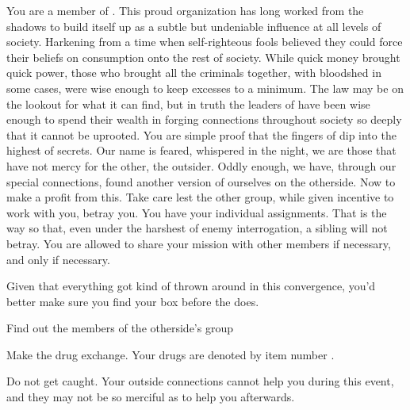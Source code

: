 \documentclass[blue]{guildcamp3}
\begin{document}
\name{\bTechMob{}}


You are a member of \bTechMob{}. This proud organization has long worked from the shadows to build itself up as a subtle but undeniable influence at all levels of \bTechWorld{} society. Harkening from a time when self-righteous fools believed they could force their beliefs on consumption onto the rest of society. While quick money brought quick power, those who brought all the criminals together, with bloodshed in some cases, were wise enough to keep excesses to a minimum. The law may be on the lookout for what it can find, but in truth the leaders of \bTechMob{} have been wise enough to spend their wealth in forging connections throughout society so deeply that it cannot be uprooted. You are simple proof that the fingers of \bTechMob{} dip into the highest of secrets. Our name is feared, whispered in the night, we are those that have not mercy for the other, the outsider. Oddly enough, we have, through our special connections, found another version of ourselves on the otherside. Now to make a profit from this. Take care lest the other group, while given incentive to work with you, betray you. You have your individual assignments. That is the way so that, even under the harshest of enemy interrogation, a sibling will not betray. You are allowed to share your mission with other members if necessary, and only if necessary.

Given that everything got kind of thrown around in this convergence, you'd better make sure you find your box before the \bMagicMob{} does. 

\begin{itemz}[Goals]
	\item Find out the members of the otherside's group
	\item Make the drug exchange. Your drugs are denoted by item number \iDrugsTech{}.
	\item Do not get caught. Your outside connections cannot help you during this event, and they may not be so merciful as to help you afterwards.
\end{itemz}

\begin{members}
	\member{\cSciOne{\intro}} 
	\member{\cSpecOpTwo{\intro}} 

\end{members}
\end{document}
